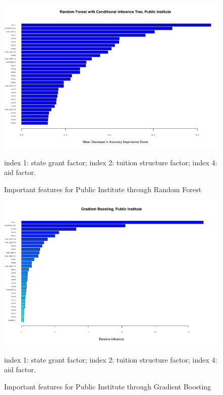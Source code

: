 \documentclass[11pt,letter]{article}
\begin{document}
\begin{figure}[H]
\begin{center}
\includegraphics[scale=0.4]{crf_public}
\caption{Important features for Public Institute through Random Forest}\label{fig:crf_public}
\vspace{-3mm}
\begin{flushleft}\small 
\centering
index 1: state grant factor; index 2: tuition structure factor; index 4: aid factor.
\end{flushleft}
\end{center}
\end{figure}

\begin{figure}[H]
\begin{center}
\includegraphics[scale=0.4]{gb_public}
\caption{Important features for Public Institute through Gradient Boosting}\label{fig:gb_public}
\vspace{-3mm}
\begin{flushleft}\small 
\centering
index 1: state grant factor; index 2: tuition structure factor; index 4: aid factor.
\end{flushleft}
\end{center}
\end{figure}
\end{document}
